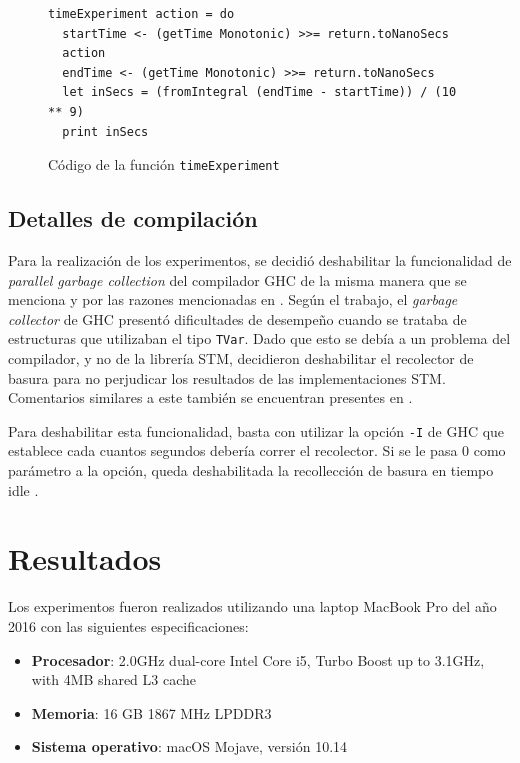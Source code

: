 \begin{figure}[H]
    \centering
\begin{verbatim}
timeExperiment action = do
  startTime <- (getTime Monotonic) >>= return.toNanoSecs
  action
  endTime <- (getTime Monotonic) >>= return.toNanoSecs
  let inSecs = (fromIntegral (endTime - startTime)) / (10 ** 9)
  print inSecs
\end{verbatim}
\caption{Código de la función \texttt{timeExperiment}}
    \label{fig:timeExperiment}
\end{figure}

\subsection{Detalles de compilación}
Para la realización de los experimentos, se decidió deshabilitar la funcionalidad de \emph{parallel garbage collection} del compilador GHC de la misma manera que se menciona y por las razones mencionadas en \cite{linked-list}.
Según el trabajo, el \emph{garbage collector} de GHC presentó dificultades de desempeño cuando se trataba de estructuras que utilizaban el tipo \texttt{TVar}. Dado que esto se debía a un problema del compilador, y no de la librería STM, decidieron deshabilitar el recolector de basura para no perjudicar los resultados de las implementaciones STM. Comentarios similares a este también se encuentran presentes en \cite{shavit}.

Para deshabilitar esta funcionalidad, basta con utilizar la opción \texttt{-I} de GHC que establece cada cuantos segundos debería correr el recolector. Si se le pasa 0 como parámetro a la opción, queda deshabilitada la recollección de basura en tiempo idle \cite{garbagecollection}.

\section{Resultados}\label{sec:results}

Los experimentos fueron realizados utilizando una laptop MacBook Pro del año 2016 con las siguientes especificaciones:

\begin{itemize}
    \item \textbf{Procesador}: 2.0GHz dual-core Intel Core i5, Turbo Boost up to 3.1GHz, with 4MB shared L3 cache
    \item \textbf{Memoria}: 16 GB 1867 MHz LPDDR3
    \item \textbf{Sistema operativo}: macOS Mojave, versión 10.14
\end{itemize}

